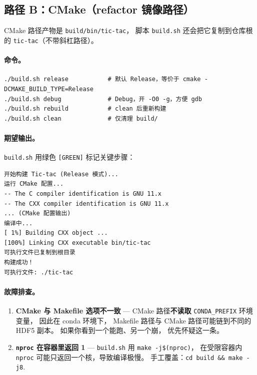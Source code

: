 \subsection{路径 B：CMake（refactor 镜像路径）}
\label{sec:ch20-build-cmake}

CMake 路径产物是 \texttt{build/bin/tic-tac}，
脚本 \texttt{build.sh} 还会把它复制到仓库根的 \texttt{tic-tac}（不带斜杠路径）。

\paragraph{命令。}
\begin{lstlisting}[style=config,caption={CMake 路径的三种形态。}]
./build.sh release           # 默认 Release，等价于 cmake -DCMAKE_BUILD_TYPE=Release
./build.sh debug             # Debug，开 -O0 -g，方便 gdb
./build.sh rebuild           # clean 后重新构建
./build.sh clean             # 仅清理 build/
\end{lstlisting}

\paragraph{期望输出。}
\texttt{build.sh} 用绿色 \texttt{[GREEN]} 标记关键步骤：
\begin{lstlisting}[style=config]
开始构建 Tic-tac (Release 模式)...
运行 CMake 配置...
-- The C compiler identification is GNU 11.x
-- The CXX compiler identification is GNU 11.x
... (CMake 配置输出)
编译中...
[ 1%] Building CXX object ...
[100%] Linking CXX executable bin/tic-tac
可执行文件已复制到根目录
构建成功！
可执行文件: ./tic-tac
\end{lstlisting}

\paragraph{故障排查。}
\begin{enumerate}
  \item \textbf{CMake 与 Makefile 选项不一致} —
        CMake 路径\textbf{不读取} \texttt{CONDA\_PREFIX} 环境变量，
        因此在 conda 环境下，
        Makefile 路径与 CMake 路径可能链到不同的 HDF5 副本。
        如果你看到一个能跑、另一个崩，
        优先怀疑这一条。
  \item \textbf{\texttt{nproc} 在容器里返回 1} — \texttt{build.sh} 用 \texttt{make -j\$(nproc)}，
        在受限容器内 \texttt{nproc} 可能只返回一个核，导致编译极慢。
        手工覆盖：\texttt{cd build \&\& make -j8}.
\end{enumerate}

